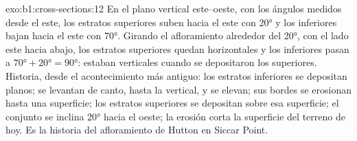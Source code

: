 \begin{solution}{exo:b1:cross-sections:12}
En el plano vertical este--oeste, con los ángulos medidos desde el este, los estratos superiores
suben hacia el este con \ang{20} y los inferiores bajan hacia el este con \ang{70}. Girando el
afloramiento alrededor del  \ang{20}, con el lado este hacia abajo, los estratos superiores
quedan horizontales y los inferiores pasan a $\ang{70} + \ang{20} = \ang{90}$: estaban verticales
cuando se depositaron los superiores. Historia, desde el acontecimiento más antiguo: los estratos
inferiores se depositan planos; se levantan de canto, hasta la vertical, y se elevan; sus bordes se
erosionan hasta una superficie; los estratos superiores se depositan sobre esa superficie; el
conjunto se inclina \ang{20} hacia el oeste; la erosión corta la superficie del terreno de hoy. Es
la historia del afloramiento de Hutton en Siccar Point.
\end{solution}

